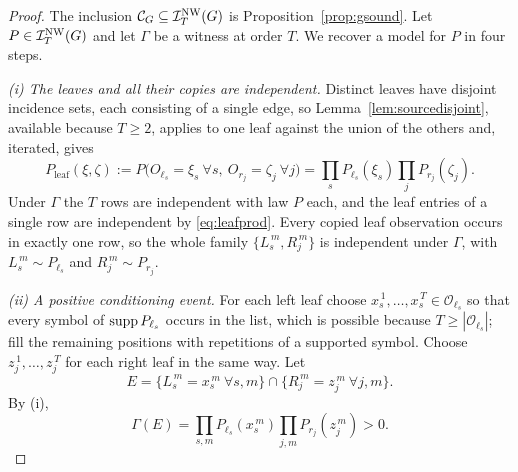 \begin{proof}
The inclusion $\mathcal C_{G}\subseteq\mathcal I^{\mathrm{NW}}_T(G)$ is Proposition~\ref{prop:gsound}. Let $P\in\mathcal I^{\mathrm{NW}}_T(G)$ and let $\Gamma$ be a witness at order $T$. We recover a model for $P$ in four steps.

\medskip
\emph{(i) The leaves and all their copies are independent.}
Distinct leaves have disjoint incidence sets, each consisting of a single edge, so Lemma~\ref{lem:sourcedisjoint}, available because $T\ge2$, applies to one leaf against the union of the others and, iterated, gives
\begin{equation}\label{eq:leafprod}
P_{\mathrm{leaf}}(\xi,\zeta):=P\bigl(O_{\ell_s}=\xi_s\ \forall s,\ O_{r_j}=\zeta_j\ \forall j\bigr)=\prod_{s}P_{\ell_s}(\xi_s)\prod_{j}P_{r_j}(\zeta_j).
\end{equation}
Under $\Gamma$ the $T$ rows are independent with law $P$ each, and the leaf entries of a single row are independent by \eqref{eq:leafprod}. Every copied leaf observation occurs in exactly one row, so the whole family $\{L_s^{\,m},R_j^{\,m}\}$ is independent under $\Gamma$, with $L_s^{\,m}\sim P_{\ell_s}$ and $R_j^{\,m}\sim P_{r_j}$.

\medskip
\emph{(ii) A positive conditioning event.}
For each left leaf choose $x_s^{\,1},\dots,x_s^{\,T}\in\mathcal O_{\ell_s}$ so that every symbol of $\operatorname{supp} P_{\ell_s}$ occurs in the list, which is possible because $T\ge|\mathcal O_{\ell_s}|$; fill the remaining positions with repetitions of a supported symbol. Choose $z_j^{\,1},\dots,z_j^{\,T}$ for each right leaf in the same way. Let
\[
E=\bigl\{L_s^{\,m}=x_s^{\,m}\ \forall s,m\bigr\}\cap\bigl\{R_j^{\,m}=z_j^{\,m}\ \forall j,m\bigr\}.
\]
By (i),
\begin{equation}\label{eq:QE}
\Gamma(E)=\prod_{s,m}P_{\ell_s}(x_s^{\,m})\prod_{j,m}P_{r_j}(z_j^{\,m})>0.
\end{equation}


\end{proof}
